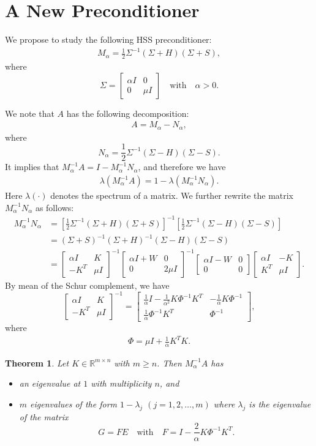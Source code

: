 \documentclass{article}
\newtheorem{theorem}{Theorem}[section]
\newcommand{\R}{\mathbb{R}}
\newcommand{\bbm}{\begin{bmatrix}}
\newcommand{\ebm}{\end{bmatrix}}
\newcommand{\lam}{\lambda}
\begin{document}
\section{A New Preconditioner}

We propose to study the following HSS preconditioner:
\begin{align}\label{preconditioner}
  M_\alpha = \frac12 \Sigma^{-1}(\Sigma + H)(\Sigma + S),
\end{align}
where
$$
\Sigma=\bbm \alpha I & 0\\ 0 & \mu I\ebm\quad\text{with}\quad \alpha>0.
$$

We note that $A$ has the following decomposition:
\begin{align*}
A = M_\alpha - N_\alpha,
\end{align*}
where
$$
N_\alpha = \frac12 \Sigma^{-1}(\Sigma - H)(\Sigma - S).
$$
It implies that $M_\alpha^{-1} A = I - M_\alpha^{-1} N_\alpha$,
and therefore we have
\begin{align*}
  \lam(M_\alpha^{-1} A) = 1 - \lam(M_\alpha^{-1} N_\alpha).
\end{align*}
Here $\lam(\cdot)$ denotes the spectrum of a matrix.
We further rewrite the matrix $M_\alpha^{-1} N_\alpha$
as follows:
\begin{align*}
  M_\alpha^{-1} N_\alpha
  & = \left[\frac12\Sigma^{-1}(\Sigma+H)(\Sigma+S)\right]^{-1}
      \left[\frac12\Sigma^{-1}(\Sigma-H)(\Sigma-S)\right]\\
  & = (\Sigma + S)^{-1}(\Sigma + H)^{-1}(\Sigma -H)(\Sigma -S)\\
  & = \bbm\alpha I & K \\ -K^T & \mu I\ebm^{-1}
      \bbm\alpha I + W & 0 \\ 0 & 2\mu I\ebm^{-1}
      \bbm\alpha I - W & 0 \\ 0 & 0\ebm
      \bbm\alpha I & -K \\ K^T & \mu I\ebm.
\end{align*}
By mean of the Schur complement, we have
$$
  \bbm\alpha I & K \\ -K^T & \mu I\ebm^{-1}
  = \bbm\frac1\alpha I-\frac{1}{\alpha^2}K\Phi^{-1}K^T
        & -\frac1\alpha K\Phi^{-1}\\
          \frac1\alpha \Phi^{-1}K^T & \Phi^{-1}\ebm,
$$
where
\begin{align*}
  \Phi = \mu I +\frac1\alpha K^T K.
\end{align*}


\begin{theorem}\label{th:01}
  Let $K\in\R^{m\times n}$ with $m\geq n$.
  Then $M_\alpha^{-1} A$ has
  \begin{itemize}
    \item[(1)] an eigenvalue at $1$ with multiplicity $n$, and
    \item[(2)] $m$ eigenvalues of the form $1-\lam_j$ $(j=1,2,\ldots,m)$ where
  $\lam_j$ is the eigenvalue of the matrix
  $$
    G = FE \quad\text{with}\quad F=I-\frac2\alpha K\Phi^{-1}K^T.
  $$
  \end{itemize}
\end{theorem}
\end{document}
